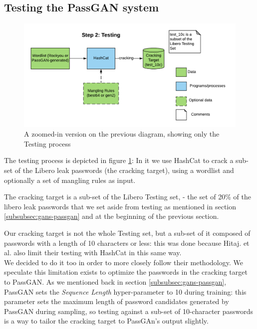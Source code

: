 \subsection{Testing the PassGAN system}\label{subsec:passgan-testing}

\begin{figure}[H]
\centering
    \includegraphics[scale=0.8]{figures/testing_only.png}
    \caption{A zoomed-in version on the previous diagram, showing only the Testing process}
    \label{fig:testing_only}
\end{figure}    

The testing process is depicted in figure \ref{fig:testing_only}: In it we use HashCat to crack a sub-set of the Libero leak passwords (the cracking target), using a wordlist and optionally a set of mangling rules as input.

The cracking target is a sub-set of the Libero Testing set, - the set of 20\% of the libero leak passwords that we set aside from testing as mentioned in section \ref{subsubsec:gans-passgan} and at the beginning of the previous section.

Our cracking target is not the whole Testing set, but a sub-set of it composed of passwords with a length of 10 characters or less: this was done because Hitaj. et al. \cite{PassGAN} also limit their testing with HashCat in this same way.\\
We decided to do it too in order to more closely follow their methodology. We speculate this limitation exists to optimize the passwords in the cracking target to PassGAN. As we mentioned back in section \ref{subsubsec:gans-passgan}, PassGAN sets the \emph{Sequence Length} hyper-parameter to 10 during training: this parameter sets the maximum length of password candidates generated by PassGAN during sampling, so testing against a sub-set of 10-character passwords is a way to tailor the cracking target to PassGAn's output slightly.

